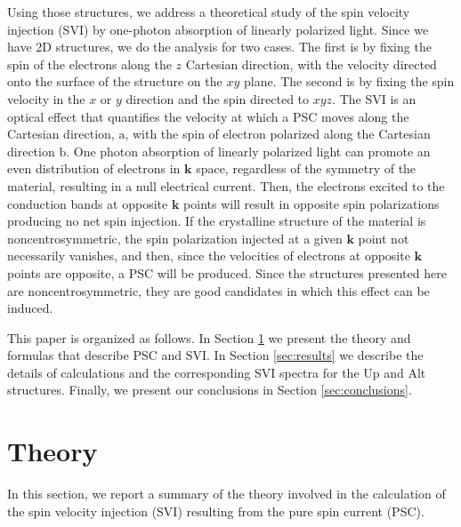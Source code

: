 \documentclass[floatfix,prb,aps,superscriptaddress,showpacs,11pt,preprint,letterpaper]{revtex4}
\begin{document}
Using those structures, we address a theoretical study of the spin velocity
injection (SVI) by one-photon absorption of linearly polarized light. Since we
have 2D structures, we do the analysis for two cases. The first is by fixing the
spin of the electrons along the $z$ Cartesian direction, with the velocity
directed onto the surface of the structure on the $xy$ plane. The second is by
fixing the spin velocity in the $x$ or $y$ direction and the spin directed to
$xyz$. The SVI is an optical effect that quantifies the velocity at which a PSC
moves along the Cartesian direction, $\mathrm{a}$, with the spin of electron
polarized along the Cartesian direction $\mathrm{b}$. One photon absorption of
linearly polarized light can promote an even distribution of electrons in
$\mathbf{k}$ space, regardless of the symmetry of the material, resulting in a
null electrical current.\cite{bhatPRL05} Then, the electrons excited to the
conduction bands at opposite $\mathbf{k}$ points will result in opposite spin
polarizations producing no net spin injection.\cite{bhatPRL05} If the
crystalline structure of the material is noncentrosymmetric, the spin
polarization injected at a given $\mathbf{k}$ point not necessarily
vanishes,\cite{alvaradoPRL85, schmiedeskampPRL88} and then, since the velocities
of electrons at opposite $\mathbf{k}$ points are opposite, a PSC will be
produced. Since the structures presented here are noncentrosymmetric, they are
good candidates in which this effect can be induced.

This paper is organized as follows. In Section \ref{sec:theory} we present the
theory and formulas that describe PSC and SVI. In Section \ref{sec:results} we
describe the details of calculations and the corresponding SVI spectra for the
Up and Alt structures. Finally, we present our conclusions in
Section \ref{sec:conclusions}.

\section{Theory} %
\label{sec:theory}

In this section, we report a summary of the theory  involved in the
calculation of the spin velocity
injection (SVI) resulting from the
pure spin current (PSC).
 
\end{document}
